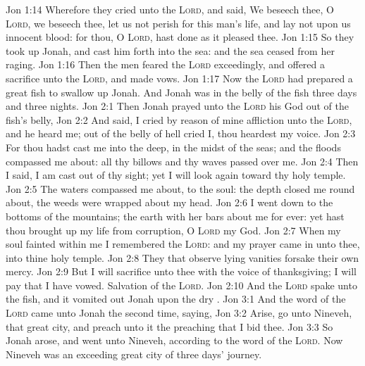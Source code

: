 \vs Jon 1:14 Wherefore they cried unto the \textsc{Lord}, and said, We beseech thee, O \textsc{Lord}, we beseech thee, let us not perish for this man's life, and lay not upon us innocent blood: for thou, O \textsc{Lord}, hast done as it pleased thee.
\vs Jon 1:15 So they took up Jonah, and cast him forth into the sea: and the sea ceased from her raging.
\vs Jon 1:16 Then the men feared the \textsc{Lord} exceedingly, and offered a sacrifice unto the \textsc{Lord}, and made vows.
\vs Jon 1:17 Now the \textsc{Lord} had prepared a great fish to swallow up Jonah. And Jonah was in the belly of the fish three days and three nights.
\vs Jon 2:1 Then Jonah prayed unto the \textsc{Lord} his God out of the fish's belly,
\vs Jon 2:2 And said, I cried by reason of mine affliction unto the \textsc{Lord}, and he heard me; out of the belly of hell cried I,  thou heardest my voice.
\vs Jon 2:3 For thou hadst cast me into the deep, in the midst of the seas; and the floods compassed me about: all thy billows and thy waves passed over me.
\vs Jon 2:4 Then I said, I am cast out of thy sight; yet I will look again toward thy holy temple.
\vs Jon 2:5 The waters compassed me about,  to the soul: the depth closed me round about, the weeds were wrapped about my head.
\vs Jon 2:6 I went down to the bottoms of the mountains; the earth with her bars  about me for ever: yet hast thou brought up my life from corruption, O \textsc{Lord} my God.
\vs Jon 2:7 When my soul fainted within me I remembered the \textsc{Lord}: and my prayer came in unto thee, into thine holy temple.
\vs Jon 2:8 They that observe lying vanities forsake their own mercy.
\vs Jon 2:9 But I will sacrifice unto thee with the voice of thanksgiving; I will pay  that I have vowed. Salvation  of the \textsc{Lord}.
\vs Jon 2:10 And the \textsc{Lord} spake unto the fish, and it vomited out Jonah upon the dry .
\vs Jon 3:1 And the word of the \textsc{Lord} came unto Jonah the second time, saying,
\vs Jon 3:2 Arise, go unto Nineveh, that great city, and preach unto it the preaching that I bid thee.
\vs Jon 3:3 So Jonah arose, and went unto Nineveh, according to the word of the \textsc{Lord}. Now Nineveh was an exceeding great city of three days' journey.
